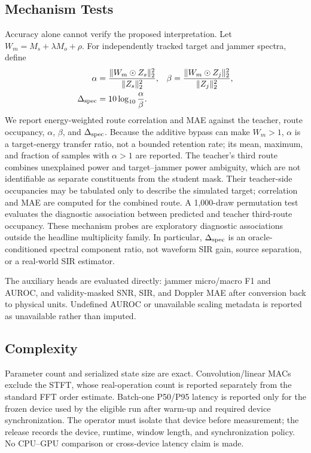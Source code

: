 \documentclass[letterpaper,journal]{IEEEtran}
\begin{document}
\subsection{Mechanism Tests}
Accuracy alone cannot verify the proposed interpretation.  Let
$W_m=M_s+\lambda M_o+\rho$.  For independently tracked target and jammer
spectra, define
\begin{align}
\alpha&=\frac{\|W_m\odot Z_s\|_2^2}{\|Z_s\|_2^2},&
\beta&=\frac{\|W_m\odot Z_j\|_2^2}{\|Z_j\|_2^2},\\
\Delta_{\rm spec}&=10\log_{10}\frac{\alpha}{\beta}.
\label{eq:mechanism}
\end{align}
We report energy-weighted route correlation and MAE against the teacher,
route occupancy, $\alpha$, $\beta$, and $\Delta_{\rm spec}$.  Because the
additive bypass can make $W_m>1$, $\alpha$ is a target-energy transfer ratio,
not a bounded retention rate; its mean, maximum, and fraction of samples with
$\alpha>1$ are reported.  The teacher's third route combines unexplained
power and target--jammer power ambiguity, which are not identifiable as
separate constituents from the student mask.  Their teacher-side occupancies
may be tabulated only to describe the simulated target; correlation and MAE
are computed for the combined route.  A 1,000-draw permutation test evaluates
the diagnostic association between predicted and teacher third-route
occupancy.  These mechanism probes are exploratory diagnostic associations
outside the headline multiplicity family.  In particular,
\(\Delta_{\rm spec}\) is an oracle-conditioned spectral component ratio, not
waveform SIR gain, source separation, or a real-world SIR estimator.

The auxiliary heads are evaluated directly: jammer micro/macro F1 and AUROC,
and validity-masked SNR, SIR, and Doppler MAE after conversion back to physical
units.  Undefined AUROC or unavailable scaling metadata is reported as
unavailable rather than imputed.

\subsection{Complexity}
Parameter count and serialized state size are exact.  Convolution/linear MACs
exclude the STFT, whose real-operation count is reported separately from the
standard FFT order estimate.  Batch-one P50/P95 latency is reported only for
the frozen device used by the eligible run after warm-up and required device
synchronization.  The operator must isolate that device before measurement;
the release records the device, runtime, window length, and synchronization
policy.  No CPU--GPU comparison or cross-device latency claim is made.
\end{document}
